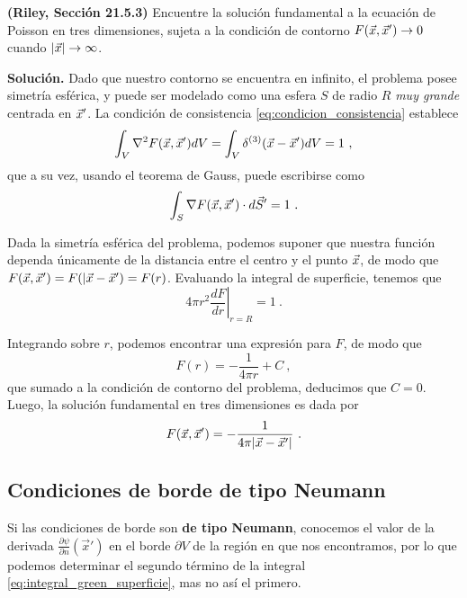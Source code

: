 \begin{ejemplo}
    \textbf{(Riley, Sección 21.5.3)} Encuentre la solución fundamental a la ecuación de Poisson en tres dimensiones, sujeta a la condición de contorno $F(\vec{x} , \vec{x}') \to 0$ cuando $|\vec{x}| \to \infty$.

    \textbf{Solución.}  Dado que nuestro contorno se encuentra en infinito, el problema posee simetría esférica, y puede ser modelado como una esfera $S$ de radio $R$ \emph{muy grande} centrada en $\vec{x}'$. La condición de consistencia \eqref{eq:condicion_consistencia} establece
    \begin{equation*}
        \int_V \nabla^2 F(\vec{x}, \vec{x}') dV = \int_V \delta^{(3)}(\vec{x}-\vec{x}') dV = 1 \ ,
    \end{equation*}
    que a su vez, usando el teorema de Gauss, puede escribirse como
    \begin{equation}
        \int_S \nabla F(\x, \x') \cdot d\vec{S}' = 1 \ .
    \end{equation}

    Dada la simetría esférica del problema, podemos suponer que nuestra función dependa únicamente de la distancia entre el centro y el punto $\vec{x}$, de modo que $F(\vec{x},\vec{x}') = F(|\vec{x}-\vec{x}') = F(r)$. Evaluando la integral de superficie, tenemos que
    \begin{equation*}
        4\pi r^2 \left. \frac{dF}{dr}\right|_{r=R} = 1 \ .
    \end{equation*}

    Integrando sobre $r$, podemos encontrar una expresión para $F$, de modo que
    \begin{equation*}
        F(r) = - \frac{1}{4\pi r} + C \ ,
    \end{equation*}
    que sumado a la condición de contorno del problema, deducimos que $C = 0$. Luego, la solución fundamental en tres dimensiones es dada por
    \begin{equation*}
        F(\x, \x') = - \frac{1}{4\pi |\x-\x'|} \ .
    \end{equation*}
\end{ejemplo}

\subsection{Condiciones de borde de tipo Neumann}


Si las condiciones de borde son \textbf{de tipo Neumann}, conocemos el valor de la derivada $\frac{\partial \psi}{\partial n}(\vec{x}')$ en el borde $\partial V$ de la región en que nos encontramos, por lo que podemos determinar el segundo término de la integral \eqref{eq:integral_green_superficie}, mas no así el primero. 

